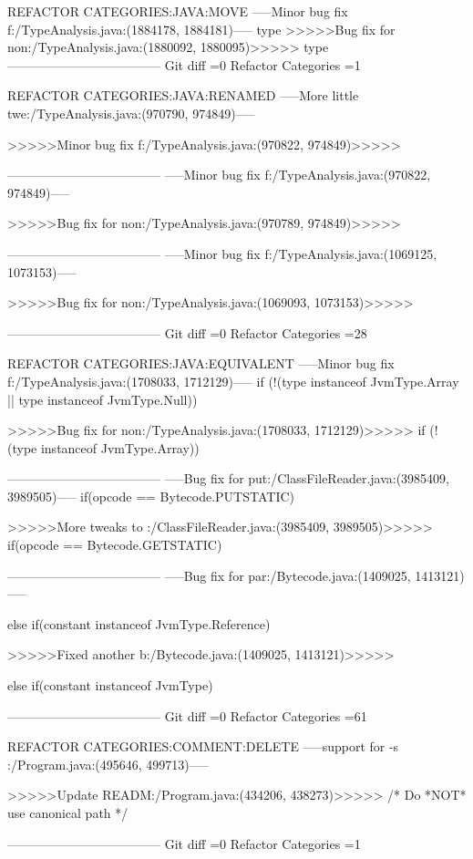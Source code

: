 REFACTOR CATEGORIES:JAVA:MOVE
-----Minor bug fix f:/TypeAnalysis.java:(1884178, 1884181)-----
type
>>>>>Bug fix for non:/TypeAnalysis.java:(1880092, 1880095)>>>>>
type
------------------------------------
Git diff =0  Refactor Categories =1

REFACTOR CATEGORIES:JAVA:RENAMED
-----More little twe:/TypeAnalysis.java:(970790, 974849)-----
{
	
>>>>>Minor bug fix f:/TypeAnalysis.java:(970822, 974849)>>>>>
{
	
------------------------------------
-----Minor bug fix f:/TypeAnalysis.java:(970822, 974849)-----
{
	
>>>>>Bug fix for non:/TypeAnalysis.java:(970789, 974849)>>>>>
{
	
------------------------------------
-----Minor bug fix f:/TypeAnalysis.java:(1069125, 1073153)-----
{
	
>>>>>Bug fix for non:/TypeAnalysis.java:(1069093, 1073153)>>>>>
{
	
------------------------------------
Git diff =0  Refactor Categories =28

REFACTOR CATEGORIES:JAVA:EQUIVALENT
-----Minor bug fix f:/TypeAnalysis.java:(1708033, 1712129)-----
		if (!(type instanceof JvmType.Array || type instanceof JvmType.Null)) {
	
>>>>>Bug fix for non:/TypeAnalysis.java:(1708033, 1712129)>>>>>
		if (!(type instanceof JvmType.Array)) {
	
------------------------------------
-----Bug fix for put:/ClassFileReader.java:(3985409, 3989505)-----
			if(opcode == Bytecode.PUTSTATIC) {
	
>>>>>More tweaks to :/ClassFileReader.java:(3985409, 3989505)>>>>>
			if(opcode == Bytecode.GETSTATIC) {
	
------------------------------------
-----Bug fix for par:/Bytecode.java:(1409025, 1413121)-----
			} else if(constant instanceof JvmType.Reference) {
	
>>>>>Fixed another b:/Bytecode.java:(1409025, 1413121)>>>>>
			} else if(constant instanceof JvmType) {
	
------------------------------------
Git diff =0  Refactor Categories =61

REFACTOR CATEGORIES:COMMENT:DELETE
-----support for -s :/Program.java:(495646, 499713)-----

	
>>>>>Update READM:/Program.java:(434206, 438273)>>>>>
 /* Do *NOT* use canonical path */
	
------------------------------------
Git diff =0  Refactor Categories =1

}}}}}}}}}}
